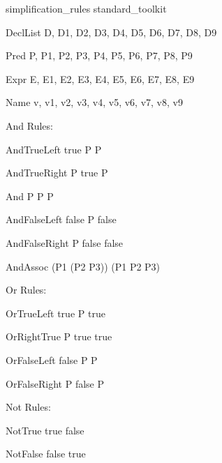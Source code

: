 \begin{zsection}
  \SECTION simplification\_rules \parents standard\_toolkit
\end{zsection}

\begin{zedjoker}{DeclList} D, D1, D2, D3, D4, D5, D6, D7, D8, D9 \end{zedjoker}
\begin{zedjoker}{Pred} P, P1, P2, P3, P4, P5, P6, P7, P8, P9 \end{zedjoker}
\begin{zedjoker}{Expr} E, E1, E2, E3, E4, E5, E6, E7, E8, E9 \end{zedjoker}
\begin{zedjoker}{Name} v, v1, v2, v3, v4, v5, v6, v7, v8, v9 \end{zedjoker}

And Rules:

\begin{zedrule}{AndTrueLeft}
  true \land P \iff P
\end{zedrule}

\begin{zedrule}{AndTrueRight}
  P \land true \iff P
\end{zedrule}

\begin{zedrule}{And}
  P \land P \iff P
\end{zedrule}

\begin{zedrule}{AndFalseLeft}
  false \land P \iff false
\end{zedrule}

\begin{zedrule}{AndFalseRight}
  P \land false \iff false
\end{zedrule}

\begin{zedrule}{AndAssoc}
  (P1 \land (P2 \land P3)) \iff (P1 \land P2 \land P3)
\end{zedrule}

Or Rules:

\begin{zedrule}{OrTrueLeft}
  true \lor P \iff true
\end{zedrule}

\begin{zedrule}{OrRightTrue}
  P \lor true \iff true
\end{zedrule}

\begin{zedrule}{OrFalseLeft}
  false \lor P \iff P
\end{zedrule}

\begin{zedrule}{OrFalseRight}
  P \lor false \iff P
\end{zedrule}

Not Rules:

\begin{zedrule}{NotTrue}
  \lnot true \iff false
\end{zedrule}

\begin{zedrule}{NotFalse}
  \lnot false \iff true
\end{zedrule}
